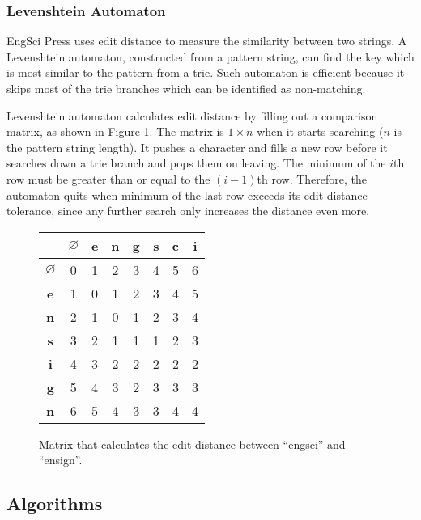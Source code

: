 \documentclass[../main.tex]{subfiles}
\begin{document}
\subsubsection{Levenshtein Automaton}

EngSci Press uses edit distance \cite{bib:edit_distance} to measure the similarity between two strings. A Levenshtein automaton, constructed from a pattern string, can find the key which is most similar to the pattern from a trie. Such automaton is efficient \cite{bib:levenshtein_automaton} because it skips most of the trie branches which can be identified as non-matching.

Levenshtein automaton calculates edit distance by filling out a comparison matrix, as shown in Figure \ref{fig:edit_distance}. The matrix is $1 \times n$ when it starts searching ($n$ is the pattern string length). It pushes a character and fills a new row before it searches down a trie branch and pops them on leaving. The minimum of the $i$th row must be greater than or equal to the $(i-1)$th row. Therefore, the automaton quits when minimum of the last row exceeds its edit distance tolerance, since any further search only increases the distance even more.

\begin{figure}
		\centering
		\begin{tabular}{|c|c|c|c|c|c|c|c|}
			\hline
			& $\varnothing$ & \textbf{e} & \textbf{n} & \textbf{g} & \textbf{s} & \textbf{c} & \textbf{i} \\
			\hline
			$\varnothing$ & 0 & 1 & 2 & 3 & 4 & 5 & 6 \\
			\hline
			\textbf{e} & 1 & 0 & 1 & 2 & 3 & 4 & 5 \\
			\hline
			\textbf{n} & 2 & 1 & 0 & 1 & 2 & 3 & 4 \\
			\hline
			\textbf{s} & 3 & 2 & 1 & 1 & 1 & 2 & 3 \\
			\hline
			\textbf{i} & 4 & 3 & 2 & 2 & 2 & 2 & 2 \\
			\hline
			\textbf{g} & 5 & 4 & 3 & 2 & 3 & 3 & 3 \\
			\hline
			\textbf{n} & 6 & 5 & 4 & 3 & 3 & 4 & 4 \\
			\hline
		\end{tabular}
		\caption{Matrix that calculates the edit distance between ``engsci'' and ``ensign''.}
		\label{fig:edit_distance}
\end{figure}

\subsection{Algorithms}
\label{ssec:algorithms}
\end{document}
